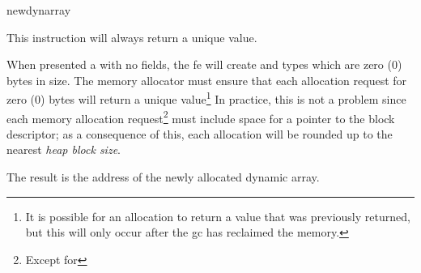 \begin{instruction}{newdynarray}

  \begin{notes}
    This instruction will always return a unique value.  

    When presented a  with no fields, the \ac{fe} will
    create  and  types which are zero (0)
    bytes in size.  The memory allocator must ensure that each
    allocation request for zero (0) bytes will return a unique
    value\footnote{It is possible for an allocation to return a value
      that was previously returned, but this will only occur after the
      \ac{gc} has reclaimed the memory.}  In practice, this is not a
    problem since each memory allocation request\footnote{Except for
      } must include space for a pointer to the block
    descriptor; as a consequence of this, each allocation will be
    rounded up to the nearest \emph{heap block size}.
  \end{notes}

  \begin{results}
  \item The result is the address of the newly allocated dynamic
    array.
  \end{results}

  \begin{operands}
  \item {}
  \item {}
  \end{operands}
\end{instruction}

